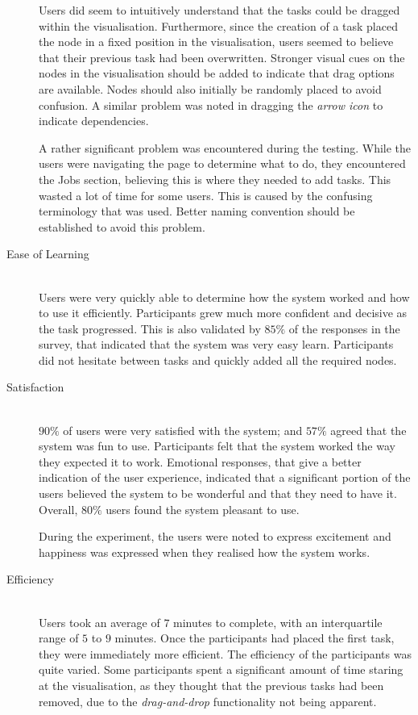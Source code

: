 \begin{description}
    Users did seem to intuitively understand that the tasks could be dragged
    within
    the visualisation. Furthermore, since the creation of a task placed the node
    in a fixed position in the visualisation, users seemed to believe that their previous task
    had been overwritten. Stronger visual cues on the nodes in the visualisation
    should be added to indicate that drag options are available. Nodes should
    also initially be randomly placed to avoid confusion. A similar problem was
    noted in dragging the \emph{arrow icon} to indicate dependencies.

    A rather significant problem was encountered during the testing. While
    the users were navigating the page to determine what to do, they encountered
    the Jobs section, believing this is where they needed to add tasks. This
    wasted a lot of time for some users. This is caused by the confusing
    terminology that was used. Better naming convention should be established to avoid
    this problem.
\item[Ease of Learning] \hfill \\
    Users were very quickly able to determine how the system worked and how to
    use it efficiently. Participants grew much more confident and decisive as
    the task progressed. This is also validated by $85\%$ of the responses in
    the survey, that indicated that the system was very easy learn.
    Participants did not hesitate between tasks and quickly added all the
    required nodes.
\item[Satisfaction] \hfill \\
    $90\%$ of users were very satisfied with the system; and $57\%$ agreed
    that the  system was fun to use.
    Participants felt that the system worked the way
    they expected it to work. Emotional responses, that give a better indication of the user
    experience, indicated that a significant portion of the users believed the
    system to be wonderful and that they need to have it. Overall, $80\%$
    users found
    the system pleasant to use.

    During the experiment, the users were noted to express excitement and
    happiness was expressed when they realised how the system works.


\item[Efficiency] \hfill \\
    Users took an average of $7$ minutes to complete, with an interquartile range
    of $5$ to $9$ minutes. Once the participants had placed the first task, they
    were immediately more efficient. The efficiency of the participants was
    quite varied. Some participants spent a significant amount of time
    staring at the visualisation, as they thought that the previous tasks had
    been removed, due to the \emph{drag-and-drop} functionality not being
    apparent.
\end{description}

